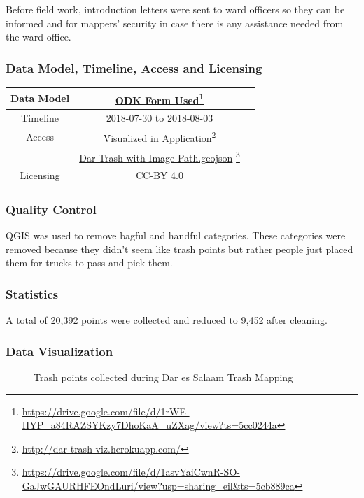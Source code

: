 \documentclass[a4paper,12pt,twoside]{article}
\begin{document}
Before field work, introduction letters were sent to ward officers so they can be informed and for mappers’ security in case there is any assistance needed from the ward office.


\medskip
\subsubsection{Data Model, Timeline, Access and Licensing}
\begin{center}
\begin{tabular}{|c|c|c|}  

 \hline
Data Model &
\href{https://drive.google.com/file/d/1rWE-HYP_a84RAZSYKzy7DhoKaA_uZXag/view?ts=5cc0244a}{ODK Form Used}\footnote{\url{https://drive.google.com/file/d/1rWE-HYP_a84RAZSYKzy7DhoKaA_uZXag/view?ts=5cc0244a}} \\
 \hline
  Timeline  &  2018-07-30 to 2018-08-03 \\
\hline  
Access & {\href{http://dar-trash-viz.herokuapp.com/}{Visualized in Application}\footnote{\url{http://dar-trash-viz.herokuapp.com/}}}\\
{} & {\href{https://drive.google.com/file/d/1asvYaiCwnR-SO-GaJwGAURHFEOndLuri/view?usp=sharing_eil&ts=5cb889ca}{Dar-Trash-with-Image-Path.geojson} \footnote{\url{https://drive.google.com/file/d/1asvYaiCwnR-SO-GaJwGAURHFEOndLuri/view?usp=sharing_eil&ts=5cb889ca}}}\\
\hline
Licensing & CC-BY 4.0\\
\hline

\end{tabular}
\end{center}

\subsubsection{Quality Control}
QGIS was used to remove bagful and handful categories.
These categories were removed because they didn't seem like trash points but rather people just placed them for trucks to pass and pick them.


\subsubsection{Statistics}
A total of 20,392 points were collected and reduced to 9,452 after cleaning.

\subsubsection{Data Visualization}
\begin{figure}[h]
  \color{RHgreen}\caption{Trash points collected during Dar es Salaam Trash Mapping}
  \centering
\end{figure}
\end{document}
